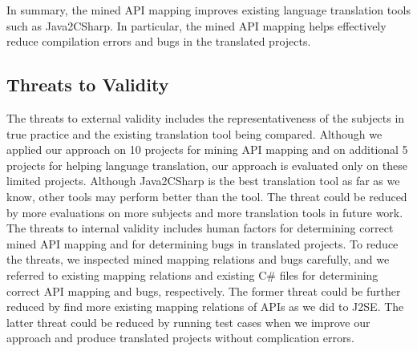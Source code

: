In summary, the mined API mapping improves existing language
translation tools such as Java2CSharp. In particular, the mined API
mapping helps effectively reduce compilation errors and bugs in the
translated projects.


\subsection{Threats to Validity}
\label{sec:evaluation:threats} The threats to external validity
includes the representativeness of the subjects in true practice and
the existing translation tool being compared. Although we applied
our approach on 10 projects for mining API mapping and on additional
5 projects for helping language translation, our approach is
evaluated only on these limited projects. Although Java2CSharp is
the best translation tool as far as we know, other tools may perform
better than the tool. The threat could be reduced by more
evaluations on more subjects and more translation tools in future
work. The threats to internal validity includes human factors for
determining correct mined API mapping and for determining bugs in
translated projects. To reduce the threats, we inspected mined
mapping relations and bugs carefully, and we referred to existing
mapping relations and existing C\# files for determining correct API
mapping and bugs, respectively. The former threat could be further
reduced by find more existing mapping relations of APIs as we did to
J2SE. The latter threat could be reduced by running test cases when
we improve our approach and produce translated projects without
complication errors.
